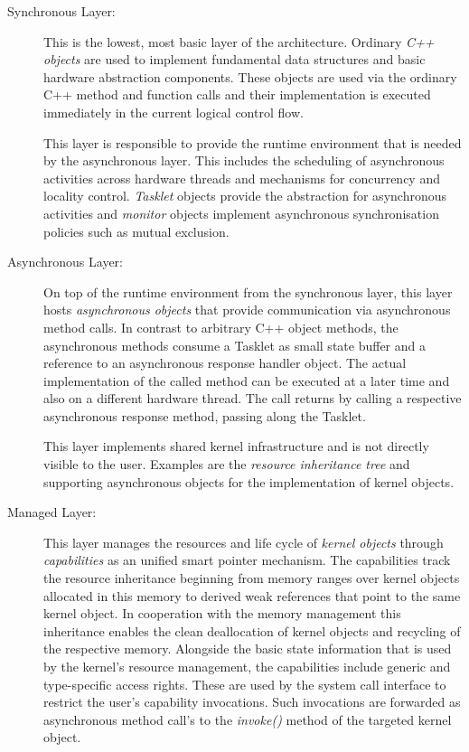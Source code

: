 \begin{description}

\item[Synchronous Layer:] This is the lowest, most basic layer of the architecture. Ordinary \emph{C++ objects} are used to implement fundamental data structures and basic hardware abstraction components. These objects are used via the ordinary C++ method and function calls and their implementation is executed immediately in the current logical control flow.

This layer is responsible to provide the runtime environment that is needed by the asynchronous layer. This includes the scheduling of asynchronous activities across hardware threads and mechanisms for concurrency and locality control. \emph{Tasklet} objects provide the abstraction for asynchronous activities and \emph{monitor} objects implement asynchronous synchronisation policies such as mutual exclusion.

\item[Asynchronous Layer:] On top of the runtime environment from the synchronous layer, this layer hosts \emph{asynchronous objects} that provide communication via asynchronous method calls. In contrast to arbitrary C++ object methods, the asynchronous methods consume a Tasklet as small state buffer and a reference to an asynchronous response handler object. The actual implementation of the called method can be executed at a later time and also on a different hardware thread. The call returns by calling a respective asynchronous response method, passing along the Tasklet. 

This layer implements shared kernel infrastructure and is not directly visible to the user. Examples are the \emph{resource inheritance tree} and supporting asynchronous objects for the implementation of kernel objects.

\item[Managed Layer:]
This layer manages the resources and life cycle of \emph{kernel objects} through \emph{capabilities} as an unified smart pointer mechanism. The capabilities track the resource inheritance beginning from memory ranges over kernel objects allocated in this memory to derived weak references that point to the same kernel object. In cooperation with the memory management this inheritance enables the clean deallocation of kernel objects and recycling of the respective memory. 
Alongside the basic state information that is used by the kernel's resource management, the capabilities include generic and type-specific access rights. These are used by the system call interface to restrict the user's capability invocations. Such invocations are forwarded as asynchronous method call's to the \emph{invoke()} method of the targeted kernel object.


\end{description}
